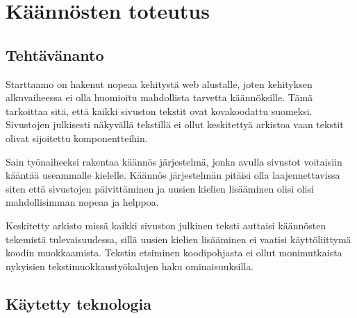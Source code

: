 \documentclass[11pt,a4paper,titlepage,oneside]{article}
\begin{document}
\newpage






\section{Käännösten toteutus}




\subsection{Tehtävänanto}


Starttaamo on hakenut nopeaa kehitystä web alustalle, joten kehityksen alkuvaiheessa 
ei olla huomioitu mahdollista tarvetta käännöksille. 
Tämä tarkoittaa sitä, että kaikki sivuston tekstit ovat kovakoodattu suomeksi.
Sivustojen julkisesti näkyvällä tekstillä ei ollut keskitettyä arkistoa vaan tekstit olivat sijoitettu komponentteihin.
\medskip

Sain työnaiheeksi rakentaa käännös järjestelmä, jonka avulla sivustot voitaisiin kääntää useammalle kielelle.
Käännös järjestelmän pitäisi olla laajennettavissa siten että sivustojen päivittäminen ja uusien kielien lisääminen olisi 
olisi mahdollisimman nopeaa ja helppoa.\\
\medskip

Keskitetty arkisto missä kaikki sivuston julkinen teksti auttaisi käännösten tekemistä tulevaisuudessa,
sillä uusien kielien lisääminen ei vaatisi käyttöliittymä koodin muokkaamista.
Tekstin etsiminen koodipohjasta ei ollut monimutkaista nykyisien tekstimuokkaustyökalujen haku ominaisuuksilla.







\subsection{Käytetty teknologia}


\end{document}
